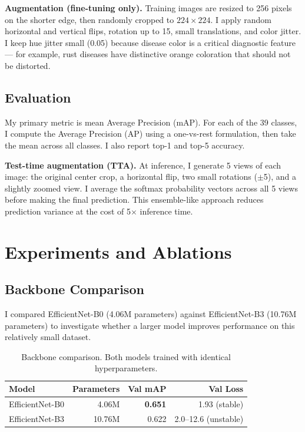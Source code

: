 \documentclass[11pt, a4paper]{article}
\begin{document}
\textbf{Augmentation (fine-tuning only).} Training images are resized to 256 pixels on the shorter edge, then randomly cropped to $224 \times 224$. I apply random horizontal and vertical flips, rotation up to 15\textdegree, small translations, and color jitter. I keep hue jitter small (0.05) because disease color is a critical diagnostic feature --- for example, rust diseases have distinctive orange coloration that should not be distorted.

\subsection{Evaluation}

My primary metric is mean Average Precision (mAP). For each of the 39 classes, I compute the Average Precision (AP) using a one-vs-rest formulation, then take the mean across all classes. I also report top-1 and top-5 accuracy.

\textbf{Test-time augmentation (TTA).} At inference, I generate 5 views of each image: the original center crop, a horizontal flip, two small rotations ($\pm$5\textdegree), and a slightly zoomed view. I average the softmax probability vectors across all 5 views before making the final prediction. This ensemble-like approach reduces prediction variance at the cost of 5$\times$ inference time.

\section{Experiments and Ablations}

\subsection{Backbone Comparison}

I compared EfficientNet-B0 (4.06M parameters) against EfficientNet-B3 (10.76M parameters) to investigate whether a larger model improves performance on this relatively small dataset.

\begin{table}[H]
\centering
\caption{Backbone comparison. Both models trained with identical hyperparameters.}
\begin{tabular}{lrrr}
\toprule
Model & Parameters & Val mAP & Val Loss \\
\midrule
EfficientNet-B0 & 4.06M & \textbf{0.651} & 1.93 (stable) \\
EfficientNet-B3 & 10.76M & 0.622 & 2.0--12.6 (unstable) \\
\bottomrule
\end{tabular}
\label{tab:backbone}
\end{table}
\end{document}

